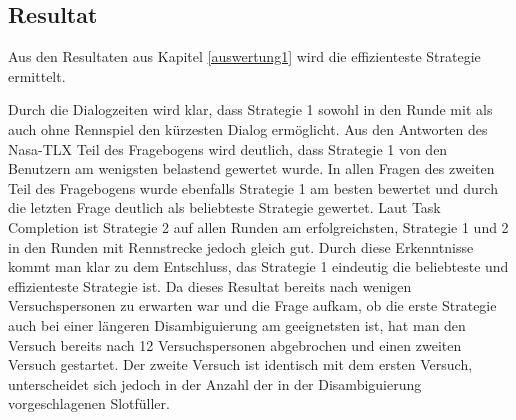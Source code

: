 \documentclass[12pt,a4paper]{scrartcl}
\begin{document}
\subsection{Resultat}
Aus den Resultaten aus Kapitel \ref{auswertung1} wird die effizienteste Strategie ermittelt. \newline

Durch die Dialogzeiten wird klar, dass Strategie 1 sowohl in den Runde mit als auch ohne Rennspiel den kürzesten Dialog ermöglicht. Aus den Antworten des Nasa-TLX Teil des Fragebogens wird deutlich, dass Strategie 1 von den Benutzern am wenigsten belastend gewertet wurde.  In allen Fragen des zweiten Teil des Fragebogens wurde ebenfalls Strategie 1 am besten bewertet und durch die letzten Frage deutlich als beliebteste Strategie gewertet. Laut Task Completion ist Strategie 2 auf allen Runden am erfolgreichsten, Strategie 1 und 2 in den Runden mit Rennstrecke jedoch gleich gut.
Durch diese Erkenntnisse kommt man klar zu dem Entschluss, das Strategie 1 eindeutig die beliebteste und effizienteste Strategie ist. \newline \newline
Da dieses Resultat bereits nach wenigen Versuchspersonen zu erwarten war und die Frage aufkam, ob die erste Strategie auch bei einer längeren Disambiguierung am geeignetsten ist, hat man den Versuch bereits nach 12 Versuchspersonen abgebrochen und einen zweiten Versuch gestartet. Der zweite Versuch ist identisch mit dem ersten Versuch, unterscheidet sich jedoch in der Anzahl der in der Disambiguierung vorgeschlagenen Slotfüller.
\end{document}
